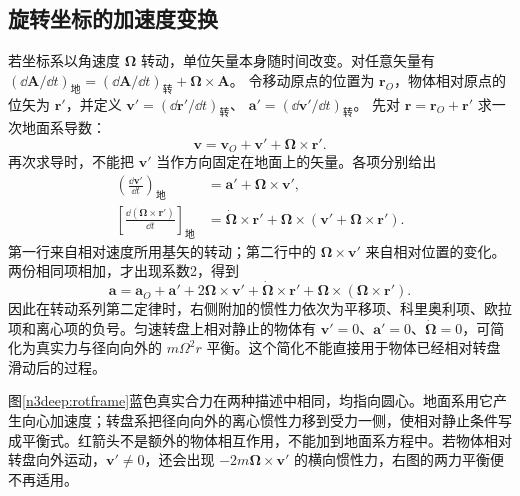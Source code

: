 \subsection{旋转坐标的加速度变换}
若坐标系以角速度 $\bm\Omega$ 转动，单位矢量本身随时间改变。对任意矢量有 $(\dd\bm A/\dd t)_{\text{地}}=(\dd\bm A/\dd t)_{\text{转}}+\bm\Omega\times\bm A$。
令移动原点的位置为 $\bm r_O$，物体相对原点的位矢为 $\bm r'$，并定义
$\bm v'=(\dd\bm r'/\dd t)_{\text{转}}$、
$\bm a'=(\dd\bm v'/\dd t)_{\text{转}}$。
先对 $\bm r=\bm r_O+\bm r'$ 求一次地面系导数：
\[
 \bm v=\bm v_O+\bm v'+\bm\Omega\times\bm r'.
\]
再次求导时，不能把 $\bm v'$ 当作方向固定在地面上的矢量。各项分别给出
\begin{align*}
 \left(\frac{\dd\bm v'}{\dd t}\right)_{\text{地}}
 &=\bm a'+\bm\Omega\times\bm v',\\
 \left[\frac{\dd(\bm\Omega\times\bm r')}{\dd t}\right]_{\text{地}}
 &=\dot{\bm\Omega}\times\bm r'
   +\bm\Omega\times(\bm v'+\bm\Omega\times\bm r').
\end{align*}
第一行来自相对速度所用基矢的转动；第二行中的
$\bm\Omega\times\bm v'$ 来自相对位置的变化。两份相同项相加，才出现系数2，得到
\[
\bm a=\bm a_O+\bm a'+2\bm\Omega\times\bm v'
+\dot{\bm\Omega}\times\bm r'+\bm\Omega\times(\bm\Omega\times\bm r').
\]
因此在转动系列第二定律时，右侧附加的惯性力依次为平移项、科里奥利项、欧拉项和离心项的负号。匀速转盘上相对静止的物体有 $\bm v'=0$、$\bm a'=0$、$\dot{\bm\Omega}=0$，可简化为真实力与径向向外的 $m\Omega^2r$ 平衡。这个简化不能直接用于物体已经相对转盘滑动后的过程。

图\ref{n3deep:rotframe}蓝色真实合力在两种描述中相同，均指向圆心。地面系用它产生向心加速度；转盘系把径向向外的离心惯性力移到受力一侧，使相对静止条件写成平衡式。红箭头不是额外的物体相互作用，不能加到地面系方程中。若物体相对转盘向外运动，$\bm v'\ne0$，还会出现 $-2m\bm\Omega\times\bm v'$ 的横向惯性力，右图的两力平衡便不再适用。

